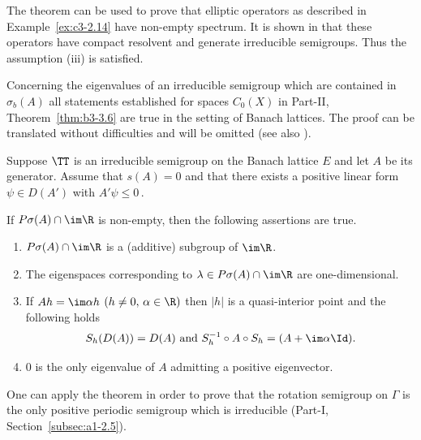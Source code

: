 The theorem can be used to prove that elliptic operators as described in Example~\ref{ex:c3-2.14} have non-empty spectrum.
It is shown in \textcite{amann:1983} that these operators have compact resolvent and generate irreducible semigroups.
Thus the assumption (iii) is satisfied.

Concerning the eigenvalues of an irreducible semigroup which are contained in $\sigma_{b}(A)$ all statements established for spaces $C_{0}(X)$ in Part-II, Theorem~\ref{thm:b3-3.6} are true in the setting of Banach lattices.
The proof can be translated without difficulties and will be omitted (see also \textcite[Theorem~2.6]{greiner:1982}).

\begin{theorem}\label{thm:c3-3.8}
	Suppose $\TT$ is an irreducible semigroup
    on the Banach lattice $E$ and let $A$ be its generator.
	Assume that $s(A) = 0$ and that there exists a positive linear form $\psi \in D(A')$ with $A'\psi \leq 0$\,.

    If\/ $P\sigma(A)\cap \im\R $ is non-empty, then the following assertions are true.
	\begin{enumerate}[\upshape (i)]
		\item 
			$P\sigma(A)\cap \im\R $ is a (additive) subgroup of\/ $\im\R $.
	
		\item 
		The eigenspaces corresponding to $\lambda \in P\sigma(A)\cap \im\R $ are one-dimensional.
	
		\item 
		If\/ $Ah = \im\alpha h$ $(h \neq 0,\, \alpha \in \R )$ then $|h|$ is a quasi-interior point and the following holds
		\begin{equation}\label{eq:c3-3.13}
			S_{h}(D(A)) = D(A) \text{ and } S_{h}^{-1}\circ A\circ S_{h} = (A + \im\alpha\Id).
		\end{equation}
		
		\item 
		$0$ is the only eigenvalue of\/ $A$ admitting a positive eigenvector.
	\end{enumerate}
\end{theorem}
One can apply the theorem in order to prove that the rotation semigroup on $\Gamma$ 
 is the only positive periodic semigroup
which is irreducible (\cf Part-I, Section~\ref{subsec:a1-2.5}).%
%
%



